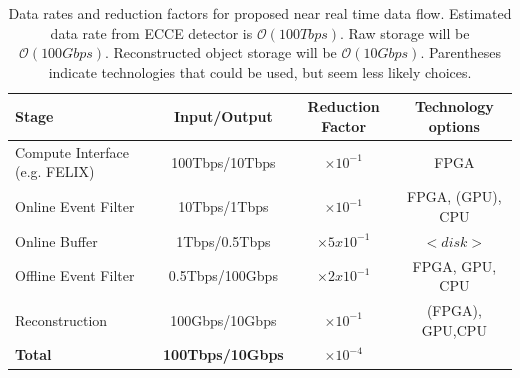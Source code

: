 \begin{table}[htb!]
    \centering
    \begin{tabular}{p{4cm}|c|c|c}
        \hline
        Stage                        & Input/Output    & Reduction Factor & Technology options \\
        \hline
        \hline
        Compute Interface (e.g. FELIX) & 100Tbps/10Tbps  & $\times 10^{-1}$ & FPGA \\
        \hline
        Online Event Filter          & 10Tbps/1Tbps    & $\times 10^{-1}$ & FPGA, (GPU), CPU\\
        \hline
        Online Buffer                & 1Tbps/0.5Tbps   & $\times 5x10^{-1}$  & $<disk>$ \\
        \hline
        Offline Event Filter         & 0.5Tbps/100Gbps & $\times 2x10^{-1}$  & FPGA, GPU, CPU \\
        \hline
        Reconstruction               & 100Gbps/10Gbps  & $\times 10^{-1}$ & (FPGA), GPU,CPU\\
        \hline
        \hline
        \textbf{Total}               & \textbf{100Tbps/10Gbps} & \textbf{$\times 10^{-4}$} & \\
        \hline
    \end{tabular}
    \caption{Data rates and reduction factors for proposed near real time data flow. Estimated data rate from ECCE detector is $\mathcal{O}(100Tbps)$. Raw storage will be $\mathcal{O}(100Gbps)$. Reconstructed object storage will be $\mathcal{O}(10Gbps)$. Parentheses indicate technologies that could be used, but seem less likely choices.}
    \label{tab:reduction_factors}
\end{table}


